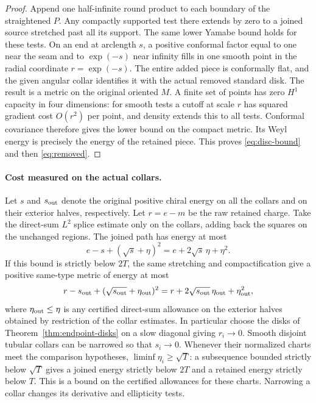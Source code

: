 \documentclass[11pt,letterpaper]{article}
\numberwithin{equation}{section}
\theoremstyle{remark}
\begin{document}
\begin{proof}
Append one half-infinite round product to each boundary of the
straightened \(P\). Any compactly supported test there extends
by zero to a joined source stretched past all its support. The
same lower Yamabe bound holds for these tests. On an end at
arclength \(s\), a positive conformal factor equal to one near
the seam and to \(\exp(-s)\) near infinity fills in one smooth
point in the radial coordinate \(r=\exp(-s)\). The entire added
piece is conformally flat, and the given angular collar
identifies it with the actual removed standard disk. The result
is a metric on the original oriented \(M\). A finite set of
points has zero \(H^1\) capacity in four dimensions: for smooth
tests a cutoff at scale \(r\) has squared gradient cost \(O(r^2)\)
per point, and density extends this to all tests. Conformal
covariance therefore gives the lower bound on the compact
metric. Its Weyl energy is precisely the energy of the retained
piece. This proves \eqref{eq:disc-bound} and then \eqref{eq:removed}.
\end{proof}

\paragraph{Cost measured on the actual collars.}
Let \(s\) and \(s_{\rm out}\) denote the original positive chiral
energy on all the collars and on their exterior halves, respectively.
Let \(r=e-m\) be the raw retained charge. Take the direct-sum
\(L^2\) splice estimate only on the collars, adding back the squares
on the unchanged regions. The joined path has energy at most
\[
 e-s+(\sqrt s+\eta)^2=e+2\sqrt{s}\,\eta+\eta^2 .
\]
If this bound is strictly below \(2T\), the same stretching and
compactification give a positive same-type metric of energy at most
\[
 r-s_{\rm out}+(\sqrt{s_{\rm out}}+\eta_{\rm out})^2
   =r+2\sqrt{s_{\rm out}}\,\eta_{\rm out}+\eta_{\rm out}^2 ,
\]
where \(\eta_{\rm out}\le\eta\) is any certified direct-sum allowance
on the exterior halves obtained by restriction of the collar estimates.
In particular choose the disks of Theorem~\ref{thm:endpoint-disks} on
a slow diagonal giving \(r_i\to0\). Smooth disjoint tubular collars
can be narrowed so that \(s_i\to0\). Whenever their normalized charts
meet the comparison hypotheses, \(\liminf\eta_i\ge\sqrt T\):
a subsequence bounded strictly below \(\sqrt T\) gives a joined
energy strictly below \(2T\) and a retained energy strictly below
\(T\). This is a bound on the certified allowances for these charts.
Narrowing a collar changes its derivative and ellipticity tests.
\end{document}
